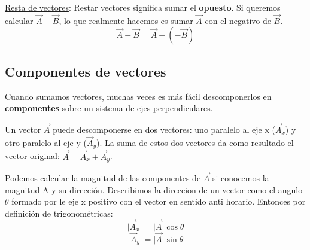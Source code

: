 \documentclass{article}
\newcommand{\newsubsection}[1]{
    \vspace{0.5cm}
    \color{sectionColor}
    \subsection{ #1}
    \color{black}
    \vspace{0.5cm}
}
\newcommand{\bl}[1]{\textbf{#1}}
\begin{document}
    \par \underline{Resta de vectores}: Restar vectores significa sumar el \bl{opuesto}. Si queremos calcular \(\vec{A}-\vec{B}\), lo que realmente hacemos es sumar \(\vec{A}\) con el negativo de \(\vec{B}\).
    \[ \vec{A}-\vec{B}=\vec{A}+(-\vec{B}) \]


    \newsubsection{Componentes de vectores}

    \par Cuando sumamos vectores, muchas veces es más fácil descomponerlos en \bl{componentes} sobre un sistema de ejes perpendiculares.
    \par Un vector \(\vec{A}\) puede descomponerse en dos vectores: uno paralelo al eje x (\(\vec{A}_x\)) y otro paralelo al eje y (\(\vec{A}_y\)). La suma de estos dos vectores da como resultado el vector original: \(\vec{A}=\vec{A}_x+\vec{A}_y\).

    \begin{figure}[H]
        \centering
		\shorthandoff{>}
		\shorthandoff{>}
    \end{figure}

    \par Podemos calcular la magnitud de las componentes de $\vec{A}$ si conocemos la magnitud A y su dirección. Describimos la direccion de un vector como el angulo $\theta$ formado por le eje x positivo con el vector en sentido anti horario. Entonces por definición de trigonométricas:
    \[ \lvert \vec{A}_x \rvert = \lvert \vec{A} \rvert \cos \theta \]
    \[ \lvert \vec{A}_y \rvert = \lvert \vec{A} \rvert \sin \theta \]
\end{document}
